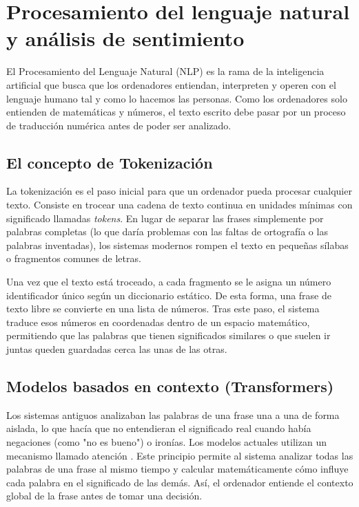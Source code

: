 \section{Procesamiento del lenguaje natural y análisis de sentimiento}
El Procesamiento del Lenguaje Natural (NLP) es la rama de la inteligencia artificial que busca que los ordenadores entiendan, interpreten y operen con el lenguaje humano tal y como lo hacemos las personas. Como los ordenadores solo entienden de matemáticas y números, el texto escrito debe pasar por un proceso de traducción numérica antes de poder ser analizado.

\subsection{El concepto de Tokenización}
La tokenización es el paso inicial para que un ordenador pueda procesar cualquier texto. Consiste en trocear una cadena de texto continua en unidades mínimas con significado llamadas \textit{tokens}. En lugar de separar las frases simplemente por palabras completas (lo que daría problemas con las faltas de ortografía o las palabras inventadas), los sistemas modernos rompen el texto en pequeñas sílabas o fragmentos comunes de letras.

Una vez que el texto está troceado, a cada fragmento se le asigna un número identificador único según un diccionario estático. De esta forma, una frase de texto libre se convierte en una lista de números. Tras este paso, el sistema traduce esos números en coordenadas dentro de un espacio matemático, permitiendo que las palabras que tienen significados similares o que suelen ir juntas queden guardadas cerca las unas de las otras.

\subsection{Modelos basados en contexto (Transformers)}
Los sistemas antiguos analizaban las palabras de una frase una a una de forma aislada, lo que hacía que no entendieran el significado real cuando había negaciones (como "no es bueno") o ironías. Los modelos actuales utilizan un mecanismo llamado atención \cite{huggingface_course}. Este principio permite al sistema analizar todas las palabras de una frase al mismo tiempo y calcular matemáticamente cómo influye cada palabra en el significado de las demás. Así, el ordenador entiende el contexto global de la frase antes de tomar una decisión.

